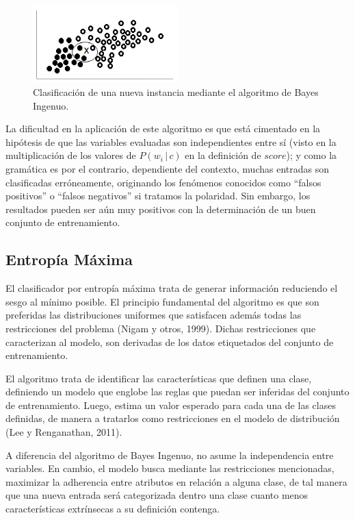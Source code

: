 {\begin{figure}[h]
\centering
\includegraphics[width=0.5\textwidth]{bayes.png}
\caption{Clasificaci\'on de una nueva instancia mediante el algoritmo de Bayes Ingenuo.}
\label{bayes}
\end{figure}

La dificultad en la aplicaci\'on de este algoritmo es que est\'a cimentado en la hip\'otesis de que las variables evaluadas son independientes entre s\'i (visto en la multiplicaci\'on de los valores de $P(w_{i} \, | \, c)$ en la definici\'on de $score$); y como la gram\'atica es por el contrario, dependiente del contexto, muchas entradas son clasificadas err\'oneamente, originando los fen\'omenos conocidos como ``falsos positivos'' o ``falsos negativos'' si tratamos la polaridad. Sin embargo, los resultados pueden ser a\'un muy positivos con la determinaci\'on de un buen conjunto de entrenamiento.

\subsection{Entrop\'ia M\'axima}

El clasificador por entrop\'ia m\'axima trata de generar informaci\'on reduciendo el sesgo al m\'inimo posible. El principio fundamental del algoritmo es que son preferidas las distribuciones uniformes que satisfacen adem\'as todas las restricciones del problema (Nigam y otros, 1999). Dichas restricciones que caracterizan al modelo, son derivadas de los datos etiquetados del conjunto de entrenamiento.
\newline

El algoritmo trata de identificar las caracter\'isticas que definen una clase, definiendo un modelo que englobe las reglas que puedan ser inferidas del conjunto de entrenamiento. Luego, estima un valor esperado para cada una de las clases definidas, de manera a tratarlos como restricciones en el modelo de distribuci\'on (Lee y Renganathan, 2011).
\newline

A diferencia del algoritmo de Bayes Ingenuo, no asume la independencia entre variables. En cambio, el modelo busca mediante las restricciones mencionadas, maximizar la adherencia entre atributos en relaci\'on a alguna clase, de tal manera que una nueva entrada ser\'a categorizada dentro una clase cuanto menos caracter\'isticas extr\'insecas a su definici\'on contenga.
\newline

}
